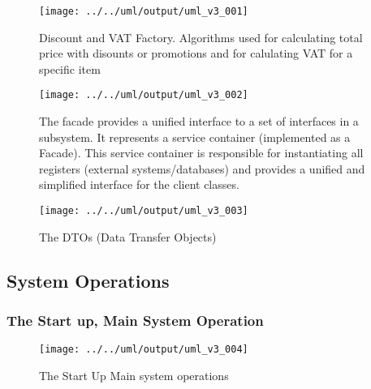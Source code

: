 \documentclass[a4paper]{scrreprt}
\begin{document}
\begin{figure}[H]
    \begin{center}
        \texttt{[image: ../../uml/output/uml\_v3\_001]}
        \caption{Discount and VAT Factory.
        Algorithms used for calculating total price with
        disounts or promotions and for
        calulating VAT for a specific item}
        \label{fig:discount-vat-factories}
    \end{center}
\end{figure}

\begin{figure}[H]
    \begin{center}
        \texttt{[image: ../../uml/output/uml\_v3\_002]}
        \caption{The facade provides a unified interface to a
        set of interfaces in a subsystem.
        It represents a service container (implemented as a Facade).
        This service container is responsible for instantiating all registers (external systems/databases) and provides
        a unified and simplified interface for the client classes.
        }
        \label{fig:facade}
    \end{center}
\end{figure}

\begin{figure}[H]
    \begin{center}
        \texttt{[image: ../../uml/output/uml\_v3\_003]}
        \caption{The DTOs (Data Transfer Objects)}
        \label{fig:DTO}
    \end{center}
\end{figure}

\newpage
\subsection*{System Operations}
\subsubsection*{The Start up, Main System Operation}
\begin{figure}[H]
    \begin{center}
        \texttt{[image: ../../uml/output/uml\_v3\_004]}
        \caption{The Start Up Main system operations}
        \label{fig:start-up}
    \end{center}
\end{figure}
%
\end{document}
